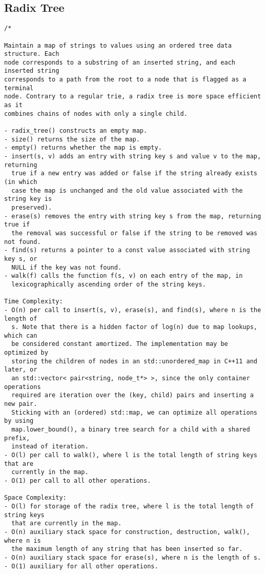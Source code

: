 \subsection{Radix Tree}
\begin{lstlisting}
/*

Maintain a map of strings to values using an ordered tree data structure. Each
node corresponds to a substring of an inserted string, and each inserted string
corresponds to a path from the root to a node that is flagged as a terminal
node. Contrary to a regular trie, a radix tree is more space efficient as it
combines chains of nodes with only a single child.

- radix_tree() constructs an empty map.
- size() returns the size of the map.
- empty() returns whether the map is empty.
- insert(s, v) adds an entry with string key s and value v to the map, returning
  true if a new entry was added or false if the string already exists (in which
  case the map is unchanged and the old value associated with the string key is
  preserved).
- erase(s) removes the entry with string key s from the map, returning true if
  the removal was successful or false if the string to be removed was not found.
- find(s) returns a pointer to a const value associated with string key s, or
  NULL if the key was not found.
- walk(f) calls the function f(s, v) on each entry of the map, in
  lexicographically ascending order of the string keys.

Time Complexity:
- O(n) per call to insert(s, v), erase(s), and find(s), where n is the length of
  s. Note that there is a hidden factor of log(n) due to map lookups, which can
  be considered constant amortized. The implementation may be optimized by
  storing the children of nodes in an std::unordered_map in C++11 and later, or
  an std::vector< pair<string, node_t*> >, since the only container operations
  required are iteration over the (key, child) pairs and inserting a new pair.
  Sticking with an (ordered) std::map, we can optimize all operations by using
  map.lower_bound(), a binary tree search for a child with a shared prefix,
  instead of iteration.
- O(l) per call to walk(), where l is the total length of string keys that are
  currently in the map.
- O(1) per call to all other operations.

Space Complexity:
- O(l) for storage of the radix tree, where l is the total length of string keys
  that are currently in the map.
- O(n) auxiliary stack space for construction, destruction, walk(), where n is
  the maximum length of any string that has been inserted so far.
- O(n) auxiliary stack space for erase(s), where n is the length of s.
- O(1) auxiliary for all other operations.


\end{lstlisting}
